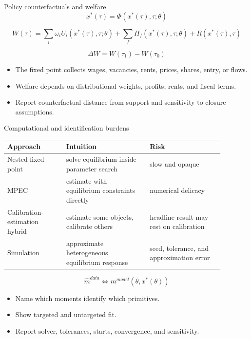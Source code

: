 \documentclass[aspectratio=169,11pt]{beamer}
\newcommand{\1}{\mathbf{1}}
\begin{document}
\begin{frame}{Policy counterfactuals and welfare}
\small
\[
x^\ast(\tau)=\Phi(x^\ast(\tau),\tau;\theta)
\]

\[
W(\tau)
=
\sum_i \omega_i U_i(x^\ast(\tau),\tau;\theta)
+
\sum_f \Pi_f(x^\ast(\tau),\tau;\theta)
+
R(x^\ast(\tau),\tau)
\]

\[
\Delta W = W(\tau_1)-W(\tau_0)
\]

\begin{itemize}
    \item The fixed point collects wages, vacancies, rents, prices, shares, entry, or flows.
    \item Welfare depends on distributional weights, profits, rents, and fiscal terms.
    \item Report counterfactual distance from support and sensitivity to closure assumptions.
\end{itemize}
\end{frame}

\begin{frame}{Computational and identification burdens}
\small
\begin{tabular}{p{0.24\linewidth} p{0.34\linewidth} p{0.30\linewidth}}
\toprule
Approach & Intuition & Risk \\
\midrule
Nested fixed point & solve equilibrium inside parameter search & slow and opaque \\
MPEC & estimate with equilibrium constraints directly & numerical delicacy \\
Calibration-estimation hybrid & estimate some objects, calibrate others & headline result may rest on calibration \\
Simulation & approximate heterogeneous equilibrium response & seed, tolerance, and approximation error \\
\bottomrule
\end{tabular}

\[
\widehat m^{data}
\Longleftrightarrow
m^{model}(\theta,x^\ast(\theta))
\]

\begin{itemize}
    \item Name which moments identify which primitives.
    \item Show targeted and untargeted fit.
    \item Report solver, tolerances, starts, convergence, and sensitivity.
\end{itemize}
\end{frame}
\end{document}
